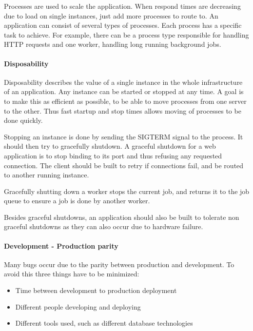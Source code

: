 Processes are used to scale the application. When respond times are decreasing
due to load on single instances, just add more processes to route to. An
application can consist of several types of processes. Each process has a
specific task to achieve. For example, there can be a process type responsible
for handling HTTP requests and one worker, handling long running background
jobs.

\paragraph{Disposability}

Disposability describes the value of a single instance in the whole
infrastructure of an application. Any instance can be started or stopped at any
time. A goal is to make this as efficient as possible, to be able to move
processes from one server to the other. Thus fast startup and stop times allows
moving of processes to be done quickly.

Stopping an instance is done by sending the SIGTERM signal to the process. It
should then try to gracefully shutdown. A graceful shutdown for a web
application is to stop binding to its port and thus refusing any requested
connection. The client should be built to retry if connections fail, and be
routed to another running instance.

Gracefully shutting down a worker stops the current job, and returns it to the
job queue to ensure a job is done by another worker.

Besides graceful shutdowns, an application should also be built to tolerate non
graceful shutdowns as they can also occur due to hardware failure.

\paragraph{Development - Production parity}

Many bugs occur due to the parity between production and development. To avoid
this three things have to be minimized:

\begin{itemize}
  \item{Time between development to production deployment}
  \item{Different people developing and deploying}
  \item{Different tools used, such as different database technologies}
\end{itemize}

